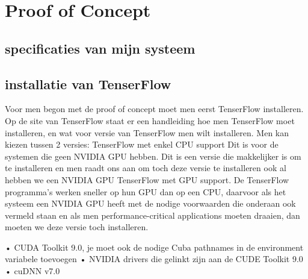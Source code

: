 
\chapter{Proof of Concept}
\label{ch:Proof of concept}


\section{specificaties van mijn systeem}

\section{installatie van TenserFlow}
Voor men begon met de proof of concept moet men eerst TenserFlow installeren. Op de site van TenserFlow staat er een handleiding hoe men TenserFlow moet installeren, en wat voor versie van TenserFlow men wilt installeren. Men kan kiezen tussen 2 versies:
TenserFlow met enkel CPU support Dit is voor de systemen die geen NVIDIA GPU hebben. Dit is een versie die makkelijker is om te installeren en men raadt ons aan om toch deze versie te installeren ook al hebben we een NVIDIA GPU
TenserFlow met GPU support. De TenserFlow programma’s werken sneller op hun GPU dan op een CPU, daarvoor als het systeem een NVIDIA GPU heeft met de nodige voorwaarden die onderaan ook vermeld staan en als men performance-critical applications moeten draaien, dan moeten we deze versie toch installeren.

•	CUDA Toolkit 9.0, je moet ook de nodige Cuba pathnames in de environment variabele toevoegen\newline
•	NVIDIA drivers die gelinkt zijn aan de CUDE Toolkit 9.0\newline
•	cuDNN v7.0 

